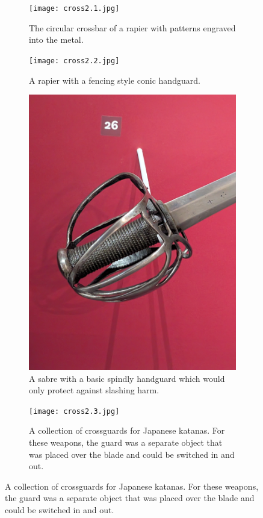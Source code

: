 \documentclass{article}
\begin{document}
\begin{figure}[H]
    \centering
    \caption{A collection of artistically designed crossbars and handguards.}
    \label{fig:crossguardsAdvanced}
    \begin{subfigure}{0.3\textwidth}
        \centering
        \texttt{[image: cross2.1.jpg]}
        \caption{The circular crossbar of a rapier with patterns engraved into the metal.}
        \label{fig:Cross2.1}
    \end{subfigure}
        \begin{subfigure}{0.3\textwidth}
        \centering
        \texttt{[image: cross2.2.jpg]}
        \caption{A rapier with a fencing style conic handguard.}
        \label{fig:Cross2.2}
    \end{subfigure}
        \begin{subfigure}{0.3\textwidth}
        \centering
        \includegraphics[width=\textwidth]{cross2.4.jpg}
        \caption{A sabre with a basic spindly handguard which would only protect against slashing harm.}
        \label{fig:Cross2.4}
    \end{subfigure}
        \begin{subfigure}{0.75\textwidth}
        \centering
        \texttt{[image: cross2.3.jpg]}
        \caption{A collection of crossguards for Japanese katanas. For these weapons, the guard was a separate object that was placed over the blade and could be switched in and out.}
        \label{fig:Cross2.3}
    \end{subfigure}
\end{figure}
\end{document}

